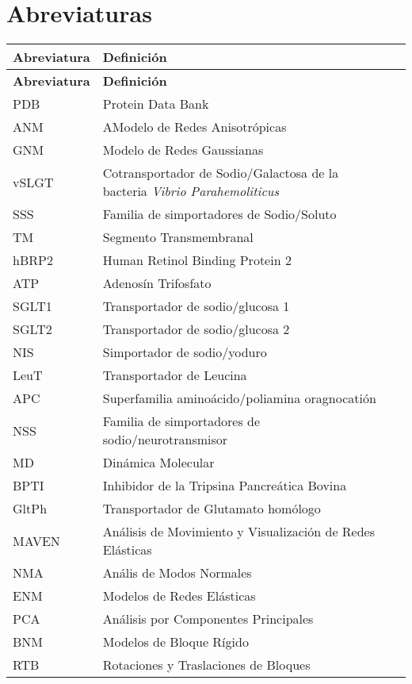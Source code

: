 \section*{Abreviaturas}
\begin{longtable}[l]{lll}\hline
   \textbf{Abreviatura} & \textbf{Definici\'{o}n} \\
 \hline%
  \endfirsthead%
 \textbf{Abreviatura} & \textbf{Definici\'{o}n} \\
  \hline%
 \endhead%
\renewcommand{\arraystretch}{1.4}\label{abre}
PDB&Protein Data Bank\\
ANM&AModelo de Redes Anisotr\'{o}picas\\
GNM&Modelo de Redes Gaussianas\\
vSLGT&Cotransportador de Sodio/Galactosa de la bacteria \textit{Vibrio Parahemoliticus}\\
SSS&Familia de simportadores de Sodio/Soluto\\
TM&Segmento Transmembranal\\ 
hBRP2&Human Retinol Binding Protein 2\\
ATP&Adenos\'{i}n Trifosfato\\
SGLT1&Transportador de sodio/glucosa 1\\
SGLT2&Transportador de sodio/glucosa 2\\
NIS&Simportador de sodio/yoduro\\
LeuT&Transportador de Leucina\\
APC&Superfamilia amino\'{a}cido/poliamina oragnocati\'{o}n\\
NSS&Familia de simportadores de sodio/neurotransmisor \\
MD& Din\'{a}mica Molecular\\
BPTI&Inhibidor de la Tripsina Pancre\'{a}tica Bovina\\
GltPh&Transportador de Glutamato hom\'{o}logo\\
MAVEN& An\'{a}lisis de Movimiento y Visualizaci\'{o}n de Redes El\'{a}sticas\\
NMA&An\'{a}lis de Modos Normales\\
ENM&Modelos de Redes El\'{a}sticas\\
PCA&An\'{a}lisis por Componentes Principales\\
BNM&Modelos de Bloque R\'{i}gido\\
RTB&Rotaciones y Traslaciones de Bloques\\
\hline
\end{longtable}
